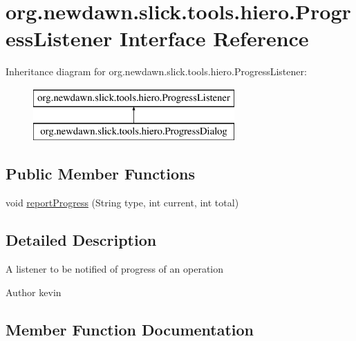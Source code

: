 \hypertarget{interfaceorg_1_1newdawn_1_1slick_1_1tools_1_1hiero_1_1_progress_listener}{}\section{org.\+newdawn.\+slick.\+tools.\+hiero.\+Progress\+Listener Interface Reference}
\label{interfaceorg_1_1newdawn_1_1slick_1_1tools_1_1hiero_1_1_progress_listener}
Inheritance diagram for org.\+newdawn.\+slick.\+tools.\+hiero.\+Progress\+Listener\+:\begin{figure}[H]
\begin{center}
\leavevmode
\includegraphics[height=2.000000cm]{interfaceorg_1_1newdawn_1_1slick_1_1tools_1_1hiero_1_1_progress_listener}
\end{center}
\end{figure}
\subsection*{Public Member Functions}
\begin{DoxyCompactItemize}
\item 
void \mbox{\hyperlink{interfaceorg_1_1newdawn_1_1slick_1_1tools_1_1hiero_1_1_progress_listener_a2b34243285df0b11dc2719c062474cfc}{report\+Progress}} (String type, int current, int total)
\end{DoxyCompactItemize}


\subsection{Detailed Description}
A listener to be notified of progress of an operation

\begin{DoxyAuthor}{Author}
kevin 
\end{DoxyAuthor}


\subsection{Member Function Documentation}
\mbox{\label{interfaceorg_1_1newdawn_1_1slick_1_1tools_1_1hiero_1_1_progress_listener_a2b34243285df0b11dc2719c062474cfc}} 
